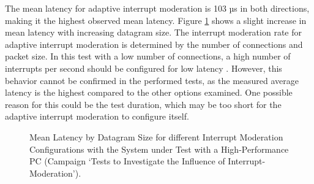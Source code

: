 The mean latency for adaptive interrupt moderation is 103 µs in both directions, making it the highest observed mean latency. Figure \ref{fig:IMean} shows a slight increase in mean latency with increasing datagram size. The interrupt moderation rate for adaptive interrupt moderation is determined by the number of connections and packet size. In this test with a low number of connections, a high number of interrupts per second should be configured for low latency \cite{intermod04}. However, this behavior cannot be confirmed in the performed tests, as the measured average latency is the highest compared to the other options examined. One possible reason for this could be the test duration, which may be too short for the adaptive interrupt moderation to configure itself.

\begin{figure}[h!]
  \centering
  \caption{Mean Latency by Datagram Size for different Interrupt Moderation Configurations with the System under Test with a High-Performance PC (Campaign `Tests to Investigate the Influence of Interrupt-Moderation').}
  \label{fig:IMean}
\end{figure}

